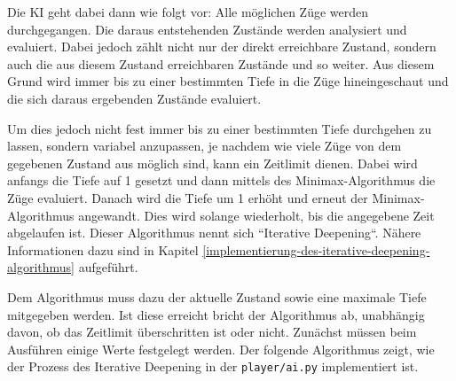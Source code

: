 Die KI geht dabei dann wie folgt vor: Alle möglichen Züge werden
durchgegangen. Die daraus entstehenden Zustände werden analysiert und
evaluiert. Dabei jedoch zählt nicht nur der direkt erreichbare Zustand,
sondern auch die aus diesem Zustand erreichbaren Zustände und so weiter.
Aus diesem Grund wird immer bis zu einer bestimmten Tiefe in die Züge
hineingeschaut und die sich daraus ergebenden Zustände evaluiert.

Um dies jedoch nicht fest immer bis zu einer bestimmten Tiefe durchgehen
zu lassen, sondern variabel anzupassen, je nachdem wie viele Züge von
dem gegebenen Zustand aus möglich sind, kann ein Zeitlimit dienen. Dabei
wird anfangs die Tiefe auf 1 gesetzt und dann mittels des
Minimax-Algorithmus die Züge evaluiert. Danach wird die Tiefe um 1
erhöht und erneut der Minimax-Algorithmus angewandt. Dies wird solange
wiederholt, bis die angegebene Zeit abgelaufen ist. Dieser Algorithmus
nennt sich ``Iterative Deepening``. Nähere Informationen dazu sind in
Kapitel \ref{implementierung-des-iterative-deepening-algorithmus} aufgeführt.

Dem Algorithmus muss dazu der aktuelle Zustand sowie eine maximale Tiefe
mitgegeben werden. Ist diese erreicht bricht der Algorithmus ab,
unabhängig davon, ob das Zeitlimit überschritten ist oder nicht.
Zunächst müssen beim Ausführen einige Werte festgelegt werden. Der
folgende Algorithmus zeigt, wie der Prozess des Iterative Deepening in
der \texttt{player/ai.py} implementiert ist.

